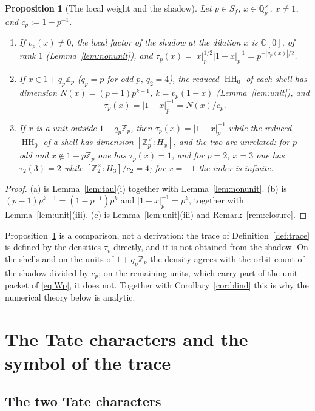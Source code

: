 \documentclass[11pt]{amsart}
\newtheorem{proposition}[theorem]{Proposition}
\theoremstyle{definition}
\theoremstyle{remark}
\newcommand{\C}{\mathbb C}
\newcommand{\Z}{\mathbb Z}
\newcommand{\Q}{\mathbb Q}
\newcommand{\HH}{\operatorname{HH}}
\begin{document}
\begin{proposition}[The local weight and the shadow]\label{prop:haarrank}
Let $p\in S_f$, $x\in\Q_p^{\times}$, $x\ne1$, and $c_p:=1-p^{-1}$.
\begin{enumerate}
\item[(a)] If $v_p(x)\ne0$, the local factor of the shadow at the dilation $x$
is $\C[0]$, of rank $1$ (Lemma~\ref{lem:nonunit}), and
$\tau_p(x)=|x|_p^{1/2}|1-x|_p^{-1}=p^{-|v_p(x)|/2}$.
\item[(b)] If $x\in1+q_p\Z_p$ ($q_p=p$ for odd $p$, $q_2=4$), the reduced
$\HH_0$ of each shell has dimension $N(x)=(p-1)p^{k-1}$, $k=v_p(1-x)$
(Lemma~\ref{lem:unit}), and
\[
\tau_p(x)=|1-x|_p^{-1}=N(x)/c_p .
\]
\item[(c)] If $x$ is a unit outside $1+q_p\Z_p$, then $\tau_p(x)=|1-x|_p^{-1}$
while the reduced $\HH_0$ of a shell has dimension $[\Z_p^{\times}:H_x]$, and
the two are unrelated: for $p$ odd and $x\notin1+p\Z_p$ one has
$\tau_p(x)=1$, and for $p=2$, $x=3$ one has $\tau_2(3)=2$ while
$[\Z_2^{\times}:H_3]/c_2=4$; for $x=-1$ the index is infinite.
\end{enumerate}
\end{proposition}

\begin{proof}
(a) is Lemma~\ref{lem:tau}(i) together with Lemma~\ref{lem:nonunit}.  (b) is
$(p-1)p^{k-1}=(1-p^{-1})p^{k}$ and $|1-x|_p^{-1}=p^{k}$, together with
Lemma~\ref{lem:unit}(iii).  (c) is Lemma~\ref{lem:unit}(iii) and
Remark~\ref{rem:closure}.
\end{proof}

Proposition~\ref{prop:haarrank} is a comparison, not a derivation: the trace
of Definition~\ref{def:trace} is defined by the densities $\tau_v$ directly, and
it is not obtained from the shadow.  On the shells and on the units of
$1+q_p\Z_p$ the density agrees with the orbit count of the shadow divided by
$c_p$; on the remaining units, which carry part of the unit packet of
\eqref{eq:Wp}, it does not.  Together with Corollary~\ref{cor:blind} this is
why the numerical theory below is analytic.

\section{The Tate characters and the symbol of the trace}\label{sec:symbol}

\subsection{The two Tate characters}
\end{document}
